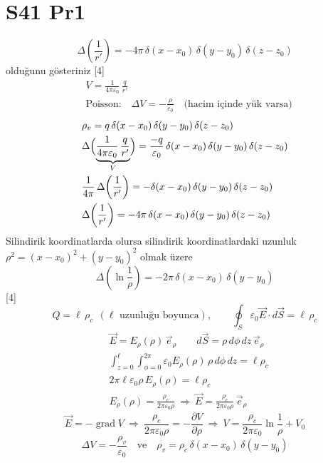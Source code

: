 \documentclass[11pt,a4paper]{article}
\begin{document}
\section{S41 Pr1}
\[ \Delta\!\left(\frac1{r'}\right)=-4\pi\,\delta(x-x_0)\,\delta(y-y_0)\,\delta(z-z_0) \]
olduğunu gösteriniz
[4]
\begin{align*}
&V=\frac{1}{4\pi\varepsilon_0}\,\frac{q}{r'}\\
&\text{Poisson:}\quad \Delta V=-\frac{\rho}{\varepsilon_0}\quad\text{(hacim içinde yük varsa)}
\end{align*}
\begin{align*}
&\rho_v=q\,\delta(x-x_0)\,\delta(y-y_0)\,\delta(z-z_0)\\
&\Delta\Bigl(\underbrace{\frac{1}{4\pi\varepsilon_0}\,\frac{q}{r'}}_{V}\Bigr)=\frac{-q}{\varepsilon_0}\,\delta(x-x_0)\,\delta(y-y_0)\,\delta(z-z_0)\\
&\frac{1}{4\pi}\,\Delta\!\left(\frac{1}{r'}\right)=-\delta(x-x_0)\,\delta(y-y_0)\,\delta(z-z_0)\\
&\Delta\!\left(\frac{1}{r'}\right)=-4\pi\,\delta(x-x_0)\,\delta(y-y_0)\,\delta(z-z_0)
\end{align*}
Silindirik koordinatlarda olursa silindirik koordinatlardaki uzunluk $\rho^2=(x-x_0)^2+(y-y_0)^2$ olmak üzere
\[ \Delta\!\left(\ln\frac1\rho\right)=-2\pi\,\delta(x-x_0)\,\delta(y-y_0) \]
[4]
\[ Q=\ell\,\rho_c\ \ (\ell\text{ uzunluğu boyunca}),\qquad \oint_S\varepsilon_0\vec E\cdot d\vec S=\ell\,\rho_c \]
\begin{align*}
&\vec E=E_\rho(\rho)\,\vec e_\rho\qquad d\vec S=\rho\,d\phi\,dz\,\vec e_\rho\\
&\int_{z=0}^{\ell}\int_{\phi=0}^{2\pi}\varepsilon_0E_\rho(\rho)\,\rho\,d\phi\,dz=\ell\rho_c\\
&2\pi\ell\varepsilon_0\rho\,E_\rho(\rho)=\ell\rho_c\\
&E_\rho(\rho)=\frac{\rho_c}{2\pi\varepsilon_0\rho}\ \Rightarrow\ \vec E=\frac{\rho_c}{2\pi\varepsilon_0\rho}\,\vec e_\rho
\end{align*}
\[ \vec E=-\operatorname{grad}V\ \Rightarrow\ \frac{\rho_c}{2\pi\varepsilon_0\rho}=-\frac{\partial V}{\partial\rho}\ \Rightarrow\ V=\frac{\rho_c}{2\pi\varepsilon_0}\ln\frac1\rho+V_0 \]
\[ \Delta V=-\frac{\rho_v}{\varepsilon_0}\quad\text{ve}\quad \rho_v=\rho_c\,\delta(x-x_0)\,\delta(y-y_0) \]
\end{document}
